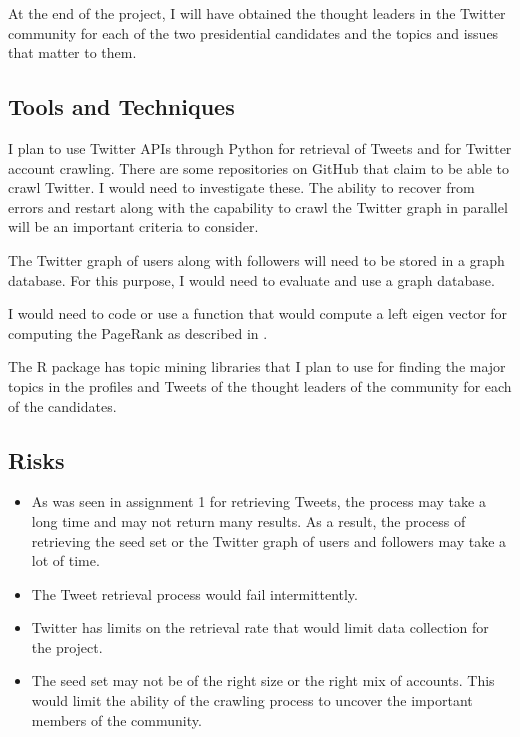 \documentclass{sig-alternate-05-2015}
\begin{document}
At the end of the project, I will have obtained the thought leaders in the Twitter community for each of the two presidential candidates and the topics and issues that matter to them.

\subsection{Tools and Techniques}

I plan to use Twitter APIs through Python for retrieval of Tweets and for Twitter account crawling. There are some repositories on GitHub that claim to be able to crawl Twitter. I would need to investigate these. The ability to recover from errors and restart along with the capability to crawl the Twitter graph in parallel will be an important criteria to consider.

The Twitter graph of users along with followers will need to be stored in a graph database. For this purpose, I would need to evaluate and use a graph database.

I would need to code or use a function that would compute a left eigen vector for computing the PageRank as described in \cite{IRB}.

The R package has topic mining libraries that I plan to use for finding the major topics in the profiles and Tweets of the thought leaders of the community for each of the candidates.

\subsection{Risks}
\begin{itemize}
\item As was seen in assignment 1 for retrieving Tweets, the process may take a long time and may not return many results. As a result, the process of retrieving the seed set or the Twitter graph of users and followers may take a lot of time.

\item The Tweet retrieval process would fail intermittently.

\item Twitter has limits on the retrieval rate that would limit data collection for the project.

\item The seed set may not be of the right size or the right mix of accounts. This would limit the ability of the crawling process to uncover the important members of the community.

\end{itemize}
\end{document}
